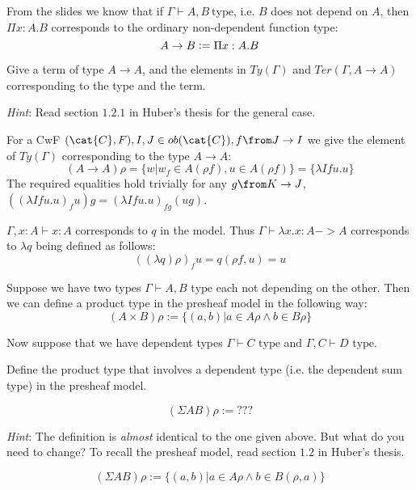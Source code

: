 \begin{exercise}
  From the slides we know that if $\Gamma \vdash A, B ~\text{type}$, i.e. $B$
  does not depend on $A$, then $\Pi x: A. B$ corresponds to the ordinary
  non-dependent function type:
  \begin{equation*}
    A \to B \vcentcolon= \Pi x: A. B
  \end{equation*}

  Give a term of type $A \to A$, and the elements in $\mathit{Ty}(\Gamma)$ and
  $\mathit{Ter}(\Gamma, A \to A)$ corresponding to the type and the term.

  \emph{Hint}: Read section $1.2.1$ in Huber's thesis for the general case.
\end{exercise}
\begin{answer}
  For a CwF $(\cat{C}, F), I, J \in ob(\cat{C}), f \from J \to I$ we give the
  element of $\mathit{Ty}(\Gamma)$ corresponding to the type $A \to A$:
  \[
    (A \to A)\rho = \{w | w_f \in A(\rho f), u \in A(\rho f)\} = \{\lambda I f u.u\}
  \]
  The required equalities hold trivially for any $g \from K \to J$, $((\lambda
  I f u.u)_f u) g = (\lambda I f u.u)_{fg} (ug)$.

  $\Gamma, x : A \vdash x : A$ corresponds to $q$ in the model. Thus $\Gamma
  \vdash \lambda x.x : A -> A$ corresponds to $\lambda q$ being defined as
  follows:
  \[
    ((\lambda q) \rho)_f u = q(\rho f, u) = u
  \]
\end{answer}

\begin{exercise}
  Suppose we have two types $\Gamma \vdash A,B \text{ type}$ each not depending
  on the other.  Then we can define a product type in the presheaf model in the
  following way:
  \[
    (A \times B)\rho := \{(a,b) | a \in A\rho \land b \in B\rho\}
  \]

  Now suppose that we have dependent types $\Gamma \vdash C \text{ type}$ and
  $\Gamma, C \vdash D \text{ type}$.

  Define the product type that involves a dependent type (i.e. the dependent
  sum type) in the presheaf model.

  \[
    (\Sigma AB)\rho := ???
  \]

  \emph{Hint}: The definition is \emph{almost} identical to the one given
  above. But what do you need to change? To recall the presheaf model, read
  section $1.2$ in Huber's thesis.
\end{exercise}
\begin{answer}
  \[
    (\Sigma AB)\rho := \{(a,b) | a \in A\rho \land b \in B(\rho, a)\}
  \]
\end{answer}

